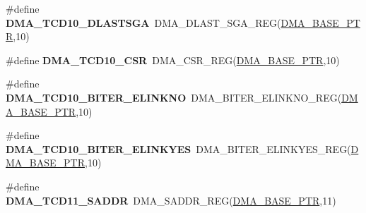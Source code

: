 \begin{DoxyCompactItemize}
\item 
\hypertarget{group___d_m_a___register___accessor___macros_gaf1953e0548e3e985d1132f7c5751734b}{}\#define {\bfseries D\+M\+A\+\_\+\+T\+C\+D10\+\_\+\+D\+L\+A\+S\+T\+S\+G\+A}~D\+M\+A\+\_\+\+D\+L\+A\+S\+T\+\_\+\+S\+G\+A\+\_\+\+R\+E\+G(\hyperlink{group___d_m_a___peripheral_ga6997fbc1b1973e9f27170217a3bd6f22}{D\+M\+A\+\_\+\+B\+A\+S\+E\+\_\+\+P\+T\+R},10)\label{group___d_m_a___register___accessor___macros_gaf1953e0548e3e985d1132f7c5751734b}

\item 
\hypertarget{group___d_m_a___register___accessor___macros_ga105f12de22dcf7bd42da746bf250ed09}{}\#define {\bfseries D\+M\+A\+\_\+\+T\+C\+D10\+\_\+\+C\+S\+R}~D\+M\+A\+\_\+\+C\+S\+R\+\_\+\+R\+E\+G(\hyperlink{group___d_m_a___peripheral_ga6997fbc1b1973e9f27170217a3bd6f22}{D\+M\+A\+\_\+\+B\+A\+S\+E\+\_\+\+P\+T\+R},10)\label{group___d_m_a___register___accessor___macros_ga105f12de22dcf7bd42da746bf250ed09}

\item 
\hypertarget{group___d_m_a___register___accessor___macros_ga72c8aa9c1103e0a6d92468dcb8cd26f7}{}\#define {\bfseries D\+M\+A\+\_\+\+T\+C\+D10\+\_\+\+B\+I\+T\+E\+R\+\_\+\+E\+L\+I\+N\+K\+N\+O}~D\+M\+A\+\_\+\+B\+I\+T\+E\+R\+\_\+\+E\+L\+I\+N\+K\+N\+O\+\_\+\+R\+E\+G(\hyperlink{group___d_m_a___peripheral_ga6997fbc1b1973e9f27170217a3bd6f22}{D\+M\+A\+\_\+\+B\+A\+S\+E\+\_\+\+P\+T\+R},10)\label{group___d_m_a___register___accessor___macros_ga72c8aa9c1103e0a6d92468dcb8cd26f7}

\item 
\hypertarget{group___d_m_a___register___accessor___macros_ga79afca17304b865c762c118811ecf7be}{}\#define {\bfseries D\+M\+A\+\_\+\+T\+C\+D10\+\_\+\+B\+I\+T\+E\+R\+\_\+\+E\+L\+I\+N\+K\+Y\+E\+S}~D\+M\+A\+\_\+\+B\+I\+T\+E\+R\+\_\+\+E\+L\+I\+N\+K\+Y\+E\+S\+\_\+\+R\+E\+G(\hyperlink{group___d_m_a___peripheral_ga6997fbc1b1973e9f27170217a3bd6f22}{D\+M\+A\+\_\+\+B\+A\+S\+E\+\_\+\+P\+T\+R},10)\label{group___d_m_a___register___accessor___macros_ga79afca17304b865c762c118811ecf7be}

\item 
\hypertarget{group___d_m_a___register___accessor___macros_gafdcf60dc4fafbaba4ef0aa8078c16b83}{}\#define {\bfseries D\+M\+A\+\_\+\+T\+C\+D11\+\_\+\+S\+A\+D\+D\+R}~D\+M\+A\+\_\+\+S\+A\+D\+D\+R\+\_\+\+R\+E\+G(\hyperlink{group___d_m_a___peripheral_ga6997fbc1b1973e9f27170217a3bd6f22}{D\+M\+A\+\_\+\+B\+A\+S\+E\+\_\+\+P\+T\+R},11)\label{group___d_m_a___register___accessor___macros_gafdcf60dc4fafbaba4ef0aa8078c16b83}


\end{DoxyCompactItemize}
